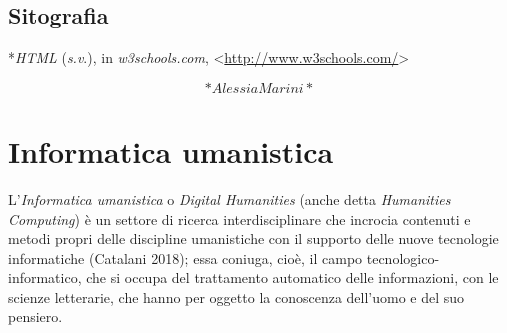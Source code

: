 \documentclass[
  b5paper,
  twoside,
  11pt,
  chapterprefix=false,
  bibliography=totocnumbered,
  parskip=0]{scrbook}
\begin{document}
\hypertarget{sitografia-17}{%
\section*{Sitografia}\label{sitografia-17}}

*\emph{HTML} (\emph{s.v}.), in \emph{w3schools.com},
\textless{}\href{http://www.w3schools.com/}{{http://www.w3schools.com/}}\textgreater{}

\[*Alessia Marini*\]

\hypertarget{informatica-umanistica}{%
\chapter{Informatica umanistica}\label{informatica-umanistica}}

L'\emph{Informatica umanistica} o \emph{Digital Humanities} (anche detta
\emph{Humanities Computing}) è un settore di ricerca interdisciplinare che
incrocia contenuti e metodi propri delle discipline umanistiche con il
supporto delle nuove tecnologie informatiche (Catalani 2018); essa
coniuga, cioè, il campo tecnologico-informatico, che si occupa del
trattamento automatico delle informazioni, con le scienze letterarie,
che hanno per oggetto la conoscenza dell'uomo e del suo pensiero.
\end{document}
